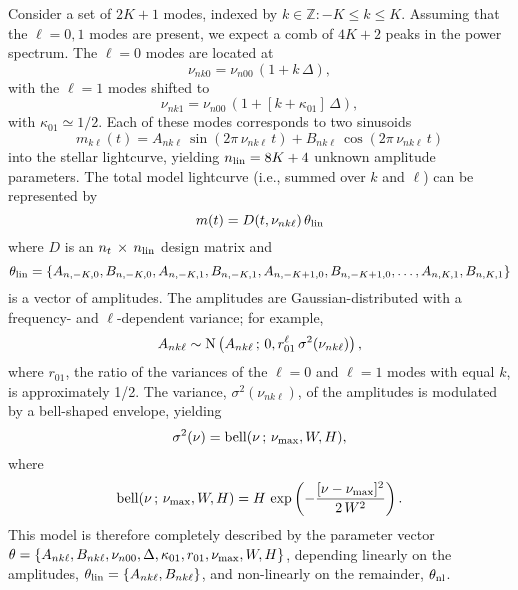 \documentclass[modern]{aastex61}
\newcommand{\normal}{\ensuremath{{\rm N}}}
\newcommand{\pars}{\ensuremath{\theta}}
\newcommand{\parsnl}{\ensuremath{\theta_{\rm nl}}}
\newcommand{\parsl}{\ensuremath{\theta_{\rm lin}}}
\newcommand{\nt}{\ensuremath{n_{t}}}
\newcommand{\nlin}{\ensuremath{n_{\rm lin}}}
\newcommand{\nukl}{\ensuremath{\nu_{nk\ell}}}
\newcommand{\nukzero}{\ensuremath{\nu_{nk0}}}
\newcommand{\nukone}{\ensuremath{\nu_{nk1}}}
\newcommand{\nuzero}{\ensuremath{\nu_{n00}}}
\newcommand{\numax}{\ensuremath{\nu_{\rm max}}}
\newcommand{\numod}{\ensuremath{{\rm bell}}}
\newcommand{\amps}{\ensuremath{A_{nk\ell}}}
\newcommand{\ampc}{\ensuremath{B_{nk\ell}}}
\newcommand{\eps}{\ensuremath{\kappa_{01}}}
\newcommand{\rl}{\ensuremath{r_{01}}}
\begin{document}
Consider a set of $2K+1$ modes, indexed by $k \in \mathbb{Z}: -K \le k \le K$. Assuming that the $\ell = 0, 1$ modes are present, we expect a comb of $4K+2$ peaks in the power spectrum. The $\ell = 0$ modes are located at
\begin{equation}
\nukzero = \nuzero \, (1 + k \, \Delta), 
\end{equation}
with the $\ell = 1$ modes shifted to
\begin{equation}
\nukone = \nuzero \, (1 + [k + \eps] \, \Delta), 
\end{equation}
with $\eps \simeq 1/2$. Each of these modes corresponds to two sinusoids
\begin{equation}
m_{k\ell}(t) = \amps \, \sin(2\pi \, \nukl \, t) + \ampc \, \cos(2\pi \, \nukl \, t)
\end{equation}
into the stellar lightcurve, yielding $\nlin = 8K+4$ unknown amplitude parameters. The total model lightcurve (i.e., summed over $k$ and $\ell$) can be represented by
\begin{equation}
m(t) = D(t, \nukl) \, \parsl
\end{equation}
where $D$ is an $\nt \, \times \, \nlin$ design matrix and
\begin{equation}
\parsl = \{ A_{n,-K,0}, B_{n,-K,0}, A_{n,-K,1}, B_{n,-K,1}, A_{n,-K+1,0}, B_{n,-K+1,0}, \ldots, A_{n,K,1}, B_{n,K,1} \}
\end{equation}
is a vector of amplitudes. The amplitudes are Gaussian-distributed with a frequency- and $\ell$-dependent variance; for example, 
\begin{equation}
\amps \sim \normal \left(\amps \, ; \, 0, \rl^\ell \, \sigma^2(\nukl) \right),
\end{equation}
where $\rl$, the ratio of the variances of the $\ell = 0$ and $\ell = 1$ modes with equal $k$, is approximately 1/2. The variance, $\sigma^2(\nukl)$, of the amplitudes is modulated by a bell-shaped envelope, yielding
\begin{equation}
\sigma^2(\nu) = \numod(\nu \, ; \, \numax, W, H),
\end{equation}
where
\begin{equation}
\numod(\nu \, ; \, \numax, W, H) = H \, \exp \left( -\frac{[\nu - \numax]^2}{2 \, W^2} \right).
\end{equation}
This model is therefore completely described by the parameter vector $\pars = \{ \amps, \ampc, \nuzero, \Delta, \eps, \rl, \numax, W, H \}$, depending linearly on the amplitudes, $\parsl = \{\amps, \ampc\}$, and non-linearly on the remainder, $\parsnl$.
\end{document}
